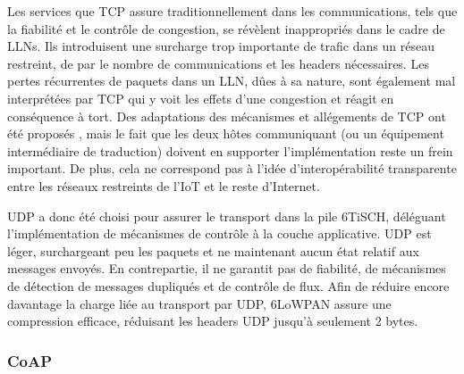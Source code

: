 \documentclass[]{report}
\begin{document}
\par Les services que TCP assure traditionnellement dans les communications, tels que la fiabilité et le contrôle de congestion, se révèlent inappropriés dans le cadre de LLNs. Ils introduisent une surcharge trop importante de trafic dans un réseau restreint, de par le nombre de communications et les headers nécessaires. Les pertes récurrentes de paquets dans un LLN, dûes à sa nature, sont également mal interprétées par TCP qui y voit les effets d'une congestion et réagit en conséquence à tort. Des adaptations des mécanismes et allégements de TCP ont été proposés \cite{stack-IoT}, mais le fait que les deux hôtes communiquant (ou un équipement intermédiaire de traduction) doivent en supporter l'implémentation reste un frein important. De plus, cela ne correspond pas à l'idée d'interopérabilité transparente entre les réseaux restreints de l'IoT et le reste d'Internet.\\

\par UDP a donc été choisi pour assurer le transport dans la pile 6TiSCH, déléguant l'implémentation de mécanismes de contrôle à la couche applicative. UDP est léger, surchargeant peu les paquets et ne maintenant aucun état relatif aux messages envoyés. En contrepartie, il ne garantit pas de fiabilité, de mécanismes de détection de messages dupliqués et de contrôle de flux. Afin de réduire encore davantage la charge liée au transport par UDP, 6LoWPAN assure une compression efficace, réduisant les headers UDP jusqu'à seulement 2 bytes.

\subsubsection{CoAP}
\end{document}
